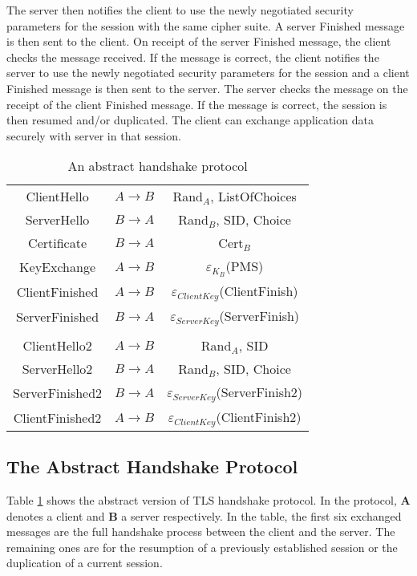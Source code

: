 \documentclass[a4paper,fleqn]{cas-dc}
\begin{document}
The server then notifies the client to use the newly negotiated security parameters for the session with the same cipher suite. A server Finished message is then sent to the client. On receipt of the server Finished message, the client checks the message received. If the message is correct, the client notifies the server to use the newly negotiated security parameters for the session and a client Finished message is then sent to the server. The server checks the message on the receipt of the client Finished message. If the message is correct, the session is then resumed and/or duplicated. The client can exchange application data securely with server in that session.

\begin{table}[]
\centering
    \begin{tabular}{ c c c }
    ClientHello & $A \rightarrow B$  & Rand$_A$, ListOfChoices \\ 
    ServerHello & $B \rightarrow A$ & Rand$_B$, SID, Choice \\  
    Certificate & $B \rightarrow A$ & Cert$_B$ \\ 
    KeyExchange & $A \rightarrow B$ & $\varepsilon_{K_B}$(PMS) \\ 
    ClientFinished & $A \rightarrow B$ & $\varepsilon_{ClientKey}$(ClientFinish) \\
   ServerFinished & $B \rightarrow A$ & $\varepsilon_{ServerKey}$(ServerFinish) \\
   \\
   ClientHello2 & $A \rightarrow B$  & Rand$_A$, SID \\
   ServerHello2 & $B \rightarrow A$ & Rand$_B$, SID, Choice \\
   ServerFinished2 & $B \rightarrow A$ & $\varepsilon_{ServerKey}$(ServerFinish2) \\
   ClientFinished2 & $A \rightarrow B$ & $\varepsilon_{ClientKey}$(ClientFinish2) \\
    \end{tabular}
    \caption{An abstract handshake protocol}
    \label{tab:tb2}
\end{table}

\subsection{The Abstract Handshake Protocol}\label{abstracthandshake}
Table \ref{tab:tb2} shows the abstract version of TLS handshake protocol. In the protocol, \textbf{A} denotes a client and \textbf{B} a server respectively. In the table, the first six exchanged messages are the full handshake process between the client and the server. The remaining ones are for the resumption of a previously established session or the duplication of a current session.
\end{document}
